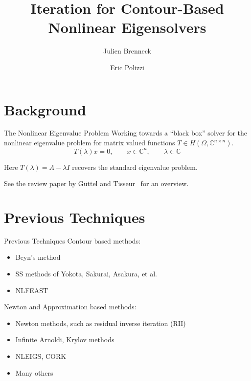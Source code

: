 \documentclass[mathserif, xcolor=table]{beamer}
\title{Iteration for Contour-Based\\ Nonlinear Eigensolvers}
\author{Julien Brenneck \and Eric Polizzi}
\institute[shortist]{UMass Amherst, Department of Mathematics and Statistics}
\date{}
\begin{document}
\begin{frame}
 \titlepage{}
 \nocite{*}
\end{frame}

\section{Background}

\begin{frame}{The Nonlinear Eigenvalue Problem}
	Working towards a ``black box'' solver for the nonlinear eigenvalue problem for matrix valued functions \( T \in H(\Omega, \mathbb{C}^{n\times n}) \).
	\vspace{1em}
	\begin{equation}
		T(\lambda)x = 0,
		\quad\quad x \in \mathbb{C}^n,
		\quad\quad \lambda \in \mathbb{C}
	\end{equation}

	\vspace{1.5em}
	Here \( T(\lambda) = A-\lambda I \) recovers the standard eigenvalue problem.

	\vspace{3em}
	See the review paper by G\"uttel and Tisseur \cite{guttel2017}~for an overview.
\end{frame}


\section{Previous Techniques}

\begin{frame}{Previous Techniques}
	Contour based methods:
	\begin{itemize}
		\item Beyn's method
		\item SS methods of Yokota, Sakurai, Asakura, et al.
		\item NLFEAST
	\end{itemize}
	
	\vspace{1em}

	Newton and Approximation based methods:
	\begin{itemize}
		\item Newton methods, such as residual inverse iteration (RII)
		\item Infinite Arnoldi, Krylov methods
		\item NLEIGS, CORK
		\item Many others
	\end{itemize}
	
\end{frame}
\end{document}
